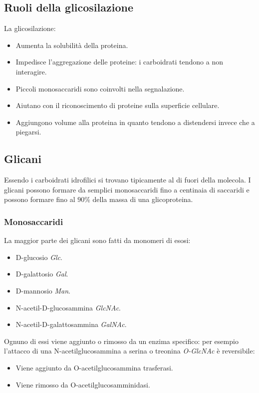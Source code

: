 	\subsection{Ruoli della glicosilazione}
	La glicosilazione:
	\begin{itemize}
		\item Aumenta la solubilit\`a della proteina.
		\item Impedisce l'aggregazione delle proteine: i carboidrati tendono a non interagire.
		\item Piccoli monosaccaridi sono coinvolti nella segnalazione.
		\item Aiutano con il riconoscimento di proteine sulla superficie cellulare.
		\item Aggiungono volume alla proteina in quanto tendono a distendersi invece che a piegarsi.
	\end{itemize}

	\subsection{Glicani}
	Essendo i carboidrati idrofilici si trovano tipicamente al di fuori della molecola.
	I glicani possono formare da semplici monosaccaridi fino a centinaia di saccaridi e possono formare fino al $90\%$ della massa di una glicoproteina.
		
		\subsubsection{Monosaccaridi}
		La maggior parte dei glicani sono fatti da monomeri di esosi:
		\begin{multicols}{2}
			\begin{itemize}
				\item D-glucosio \emph{Glc}.
				\item D-galattosio \emph{Gal}.
				\item D-mannosio \emph{Man}.
				\item N-acetil-D-glucosammina \emph{GlcNAc}.
				\item N-acetil-D-galattosammina \emph{GalNAc}.
			\end{itemize}
		\end{multicols}
		Ognuno di essi viene aggiunto o rimosso da un enzima specifico: per esempio l'attacco di una N-acetilglucosammina a serina o treonina \emph{O-GlcNAc} \`e reversibile:
		\begin{multicols}{2}
			\begin{itemize}
				\item Viene aggiunto da O-acetilglucosammina trasferasi.
				\item Viene rimosso da O-acetilglucosamminidasi.
			\end{itemize}
		\end{multicols}

